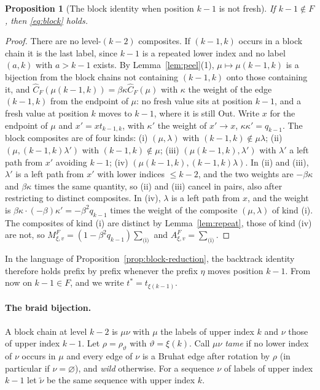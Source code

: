 \documentclass[11pt]{article}
\newtheorem{proposition}{Proposition}
\begin{document}
\begin{proposition}[The block identity when position $k-1$ is not fresh]
\label{prop:block-notfresh}
If $k-1\notin F$, then \eqref{eq:block} holds.
\end{proposition}

\begin{proof}
There are no level-$(k-2)$ composites. If $(k-1,k)$ occurs in a block
chain it is the last label, since $k-1$ is a repeated lower index and
no label $(a,k)$ with $a>k-1$ exists. By Lemma~\ref{lem:peel}(1),
$\mu\mapsto\mu(k-1,k)$ is a bijection from the block chains not
containing $(k-1,k)$ onto those containing it, and
$\widehat C_F(\mu(k-1,k))=\beta\kappa\widehat C_F(\mu)$ with
$\kappa$ the weight of the edge $(k-1,k)$ from the endpoint of $\mu$:
no fresh value sits at position $k-1$, and a fresh value at position
$k$ moves to $k-1$, where it is still Out. Write $x$ for the endpoint
of $\mu$ and $x'=xt_{k-1,k}$, with $\kappa'$ the weight of $x'\to x$,
$\kappa\kappa'=q_{k-1}$. The block composites are of four kinds:
(i) $(\mu,\lambda)$ with $(k-1,k)\notin\mu\lambda$; (ii)
$(\mu,(k-1,k)\lambda')$ with $(k-1,k)\notin\mu$; (iii)
$(\mu(k-1,k),\lambda')$ with $\lambda'$ a left path from $x'$ avoiding
$k-1$; (iv) $(\mu(k-1,k),(k-1,k)\lambda)$. In (ii) and (iii), $\lambda'$
is a left path from $x'$ with lower indices $\leq k-2$, and the two
weights are $-\beta\kappa$ and $\beta\kappa$ times the same quantity,
so (ii) and (iii) cancel in pairs, also after restricting to distinct
composites. In (iv), $\lambda$ is a left path from $x$, and the weight
is $\beta\kappa\cdot(-\beta)\kappa'=-\beta^2q_{k-1}$ times the weight
of the composite $(\mu,\lambda)$ of kind (i). The composites of kind
(i) are distinct by Lemma~\ref{lem:repeat}, those of kind (iv) are
not, so $M^F_{\xi,v}=(1-\beta^2q_{k-1})\sum_{\text{(i)}}$ and
$A^F_{\xi,v}=\sum_{\text{(i)}}$.
\end{proof}

In the language of Proposition~\ref{prop:block-reduction}, the
backtrack identity therefore holds prefix by prefix whenever the
prefix $\eta$ moves position $k-1$. From now on $k-1\in F$, and we
write $t^\ast=t_{\xi(k-1)}$.

\paragraph{The braid bijection.}
A block chain at level $k-2$ is $\mu\nu$ with $\mu$ the labels of
upper index $k$ and $\nu$ those of upper index $k-1$. Let
$\rho=\rho_{\vartheta}$ with $\vartheta=\xi(k)$. Call $\mu\nu$
\emph{tame} if no lower index of $\nu$ occurs in $\mu$ and every edge of
$\nu$ is a Bruhat edge after rotation by $\rho$ (in particular if
$\nu=\varnothing$), and \emph{wild} otherwise. For a sequence $\nu$ of
labels of upper index $k-1$ let $\tilde\nu$ be the same sequence with
upper index $k$.
\end{document}
